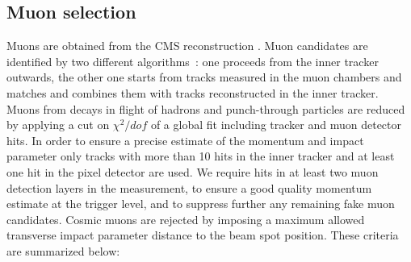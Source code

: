 \subsection{Muon selection}
\label{sec:muon_cuts}
Muons are obtained from the CMS reconstruction \cite{MUONPAS}.
Muon candidates are identified by two different 
algorithms~\cite{MUONPAS}: one proceeds from the inner tracker outwards, 
the other one starts from tracks measured in the muon chambers and matches 
and combines them with tracks reconstructed in the inner tracker. 
Muons from decays in flight of hadrons and punch-through particles are 
reduced by applying a cut on $\chi^2/dof$
of a global fit including tracker and muon detector hits.
In order to ensure a precise estimate of the momentum and impact parameter
only tracks with more than 10 hits in the inner tracker and at least 
one hit in the pixel detector are used.
We require hits in at least two muon detection layers in the measurement,
to ensure a good quality momentum estimate at the trigger level, and
to suppress further any remaining fake muon candidates.
Cosmic muons are rejected by imposing a maximum allowed transverse impact parameter 
distance to the beam spot position.
These criteria are summarized below:
